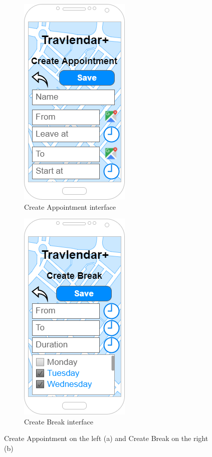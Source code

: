\begin{figure}[h]
\centering
\begin{subfigure}{.5\textwidth}
  \centering
  \includegraphics[height=.4\textheight, keepaspectratio=true]{Img/CreateAppointment}
  \caption{Create Appointment interface}
\end{subfigure}%
\begin{subfigure}{.5\textwidth}
  \centering
  \includegraphics[height=.4\textheight, keepaspectratio=true]{Img/CreateBreak}
  \caption{Create Break interface}
\end{subfigure}
\caption{Create Appointment on the left (a) and Create Break on the right (b)}
\end{figure}
\clearpage

